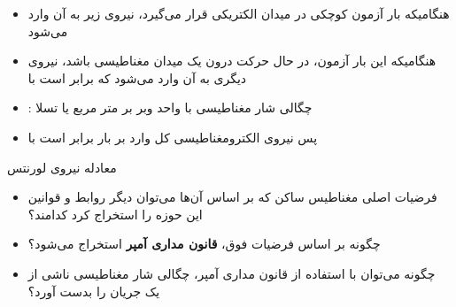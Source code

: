 \ELhold


\begin{ELunit}


\end{ELunit}

\ELhold


\begin{ELunit}

\begin{itemize}
\tightlist
\item
  هنگامیکه بار آزمون کوچکی در میدان الکتریکی  قرار می‌گیرد، نیروی زیر به آن وارد می‌شود
\end{itemize}


\begin{itemize}
\tightlist
\item
  هنگامیکه این بار آزمون، در حال حرکت درون یک میدان مغناطیسی باشد، نیروی دیگری به آن وارد می‌شود که برابر است با
\end{itemize}


\end{ELunit}

\begin{ELjoin}

\begin{itemize}
\tightlist
\item
  : چگالی شار مغناطیسی با واحد وبر بر متر مربع یا تسلا
\item
  پس نیروی الکترومغناطیسی کل وارد بر بار  برابر است با
\end{itemize}

\begin{ELimportant}{معادله نیروی لورنتس}


\end{ELimportant}

\end{ELjoin}

\begin{ELunit}


\begin{itemize}
\tightlist
\item
  فرضیات اصلی مغناطیس ساکن که بر اساس آن‌ها می‌توان دیگر روابط و قوانین این حوزه را استخراج کرد کدامند؟
\item
  چگونه بر اساس فرضیات فوق، \textbf{قانون مداری آمپر} استخراج می‌شود؟
\item
  چگونه می‌توان با استفاده از قانون مداری آمپر، چگالی شار مغناطیسی ناشی از یک جریان را بدست آورد؟
\end{itemize}

\end{ELunit}

